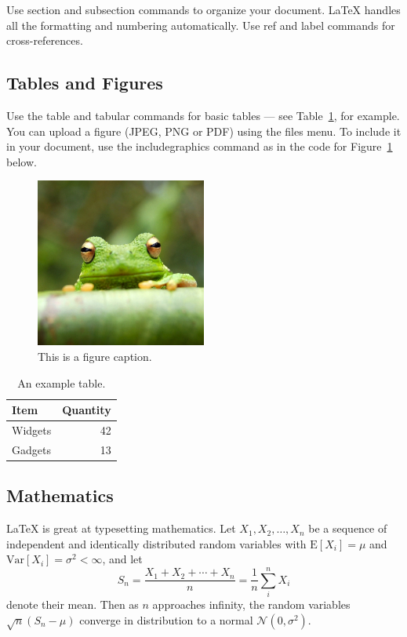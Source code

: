 \documentclass[paper=a4, fontsize=11pt]{scrartcl}
\begin{document}
Use section and subsection commands to organize your document. \LaTeX{} handles all the formatting and numbering automatically. Use ref and label commands for cross-references.

\subsection{Tables and Figures}

Use the table and tabular commands for basic tables --- see Table~\ref{tab:widgets}, for example. You can upload a figure (JPEG, PNG or PDF) using the files menu. To include it in your document, use the includegraphics command as in the code for Figure~\ref{fig:frog} below.

\begin{figure}
\centering
\includegraphics[width=0.5\textwidth]{images/frog.jpg}
\caption{\label{fig:frog}This is a figure caption.}
\end{figure}

\begin{table}
\centering
\begin{tabular}{l|r}
Item & Quantity \\\hline
Widgets & 42 \\
Gadgets & 13
\end{tabular}
\caption{\label{tab:widgets}An example table.}
\end{table}

\subsection{Mathematics}

\LaTeX{} is great at typesetting mathematics. Let $X_1, X_2, \ldots, X_n$ be a sequence of independent and identically distributed random variables with $\text{E}[X_i] = \mu$ and $\text{Var}[X_i] = \sigma^2 < \infty$, and let
$$S_n = \frac{X_1 + X_2 + \cdots + X_n}{n}
      = \frac{1}{n}\sum_{i}^{n} X_i$$
denote their mean. Then as $n$ approaches infinity, the random variables $\sqrt{n}(S_n - \mu)$ converge in distribution to a normal $\mathcal{N}(0, \sigma^2)$.
\end{document}
